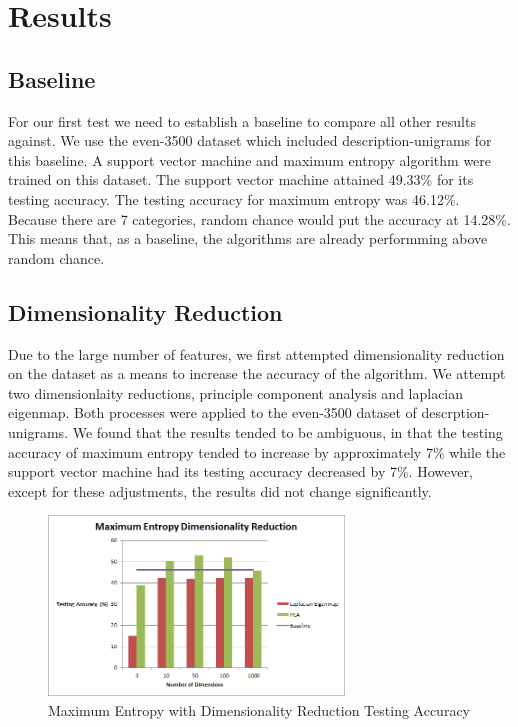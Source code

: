 \section{Results}
\subsection{Baseline}
For our first test we need to establish a baseline to compare all other results against.  We use the even-3500 dataset which included  description-unigrams for this baseline.  A support vector machine and maximum entropy algorithm were trained on this dataset.  The support vector machine attained 49.33\% for its testing accuracy. The testing accuracy for maximum entropy was 46.12\%.  Because there are 7 categories, random chance would put the accuracy at 14.28\%.  This means that, as a baseline, the algorithms are already performming above random chance.

\subsection{Dimensionality Reduction}
Due to the large number of features, we first attempted dimensionality reduction on the dataset as a means to increase the accuracy of the algorithm.  We attempt two dimensionlaity reductions, principle component analysis and laplacian eigenmap. Both processes were applied to the even-3500 dataset of descrption-unigrams.  We found that the results tended to be ambiguous, in that the testing accuracy of maximum entropy tended to increase by approximately 7\% while the support vector machine had its testing accuracy decreased by 7\%.  However, except for these adjustments, the results did not change significantly.
\\

\begin{figure}[!h]
\begin{center}
\caption{Maximum Entropy with Dimensionality Reduction Testing Accuracy}
\includegraphics[width=0.7\textwidth]{Maximum_Entropy_Dimensionality_Reduction.png}
\end{center}
\end{figure}

